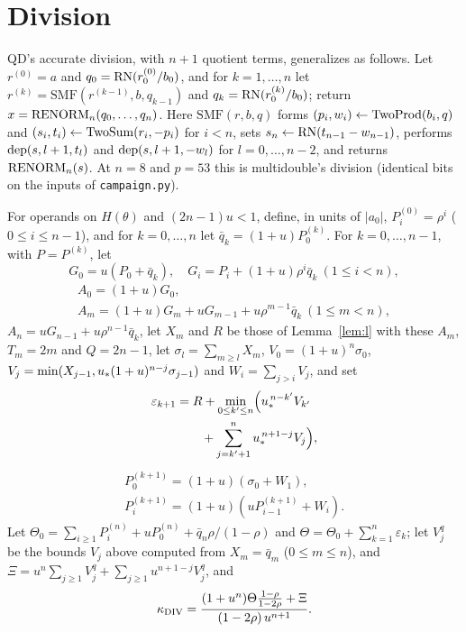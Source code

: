 \section{Division}

QD's accurate division, with $n+1$ quotient terms, generalizes as follows. Let $r^{(0)} = a$
and $q_0 = \mathrm{RN}(r^{(0)}_0/b_0)$, and for $k = 1, \dots, n$ let $r^{(k)} = \mathrm{SMF}(r^{(k-1)}, b, q_{k-1})$ and $q_k =
\mathrm{RN}(r^{(k)}_0/b_0)$; return $x = \mathrm{RENORM}_n(q_0, \dots, q_n)$. Here $\mathrm{SMF}(r, b, q)$ forms $(p_i, w_i) \gets
\mathrm{TwoProd}(b_i, q)$ and $(s_i, t_i) \gets \mathrm{TwoSum}(r_i, -p_i)$ for $i < n$, sets $s_n \gets \mathrm{RN}(t_{n-1} - w_{n-1})$,
performs $\mathrm{dep}(s, l+1, t_l)$ and $\mathrm{dep}(s, l+1, -w_l)$ for $l = 0, \dots, n-2$, and returns $\mathrm{RENORM}_n(s)$. At $n = 8$ and $p =
53$ this is multidouble's division (identical bits on the inputs of \texttt{campaign.py}).

 For operands on $H(\theta)$ and $(2n-1)u < 1$, define, in units of $|a_0|$, $P^{(0)}_i = \rho^i$ ($0 \le i \le n-1$), and for $k = 0, \dots, n$ let
$\bar q_k = (1+u)P^{(k)}_0$. For $k = 0, \dots, n-1$, with $P = P^{(k)}$, let
\[
G_0 = u(P_0 + \bar q_k), \quad G_i = P_i + (1+u)\rho^i\bar q_k \ (1 \le i < n),
\]
\begin{gather*}
A_0 = (1+u)G_0, \\
A_m = (1+u)G_m + uG_{m-1} + u\rho^{m-1}\bar q_k \ (1 \le m < n),
\end{gather*}
$A_n = uG_{n-1} + u\rho^{n-1}\bar q_k$,
let $X_m$ and $R$ be those of Lemma~\ref{lem:l} with these $A_m$, $T_m = 2m$ and $Q = 2n-1$, let $\sigma_l = \sum_{m \ge l}X_m$, $V_0 = (1+u)^n\sigma_0$, $V_j =
\min(X_{j-1}, u_{*}(1+u)^{n-j}\sigma_{j-1})$ and $W_i = \sum_{j > i}V_j$, and set
\begin{align*}
\varepsilon_{k+1} &= R + \min_{0 \le k' \le n}\Bigl(u_{*}^{\,n-k'}V_{k'} \\
&\qquad + \sum_{j=k'+1}^n u_{*}^{\,n+1-j}V_j\Bigr),
\end{align*}
\begin{gather*}
P^{(k+1)}_0 = (1+u)(\sigma_0 + W_1), \\
P^{(k+1)}_i = (1+u)(uP^{(k+1)}_{i-1} + W_i).
\end{gather*}
Let $\Theta_0 = \sum_{i \ge 1}P^{(n)}_i + uP^{(n)}_0 + \bar q_n\rho/(1-\rho)$ and $\Theta = \Theta_0 + \sum_{k=1}^n \varepsilon_k$; let
$V^q_j$ be the bounds $V_j$ above computed from $X_m = \bar q_m$ ($0 \le m \le n$), and $\Xi = u^n\sum_{j \ge 1}V^q_j +
\sum_{j \ge 1}u^{n+1-j}V^q_j$,
and
\[
\kappa_{\rm DIV} = \frac{(1+u^n)\Theta\frac{1-\rho}{1-2\rho} + \Xi}{(1-2\rho)\,u^{n+1}}.
\]

